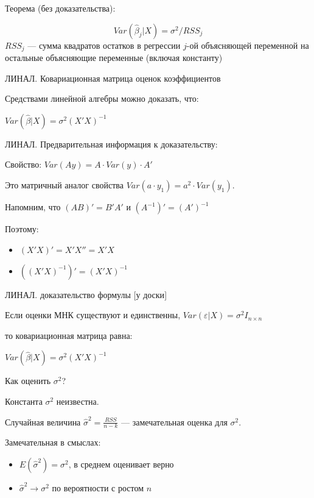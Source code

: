 \documentclass[russian,ignorenonframetext,]{beamer}
\begin{document}
\begin{frame}{Теорема (без доказательства):}

\[
Var(\hat{\beta}_j| X)=\sigma^2/RSS_j
\] \(RSS_j\) --- сумма квадратов остатков в регрессии \(j\)-ой
объясняющей переменной на остальные объясняющие переменные (включая
константу)

\end{frame}

\begin{frame}{ЛИНАЛ. Ковариационная матрица оценок коэффициентов}

Средствами линейной алгебры можно доказать, что:

\(Var(\hat{\beta}|X)=\sigma^2 (X'X)^{-1}\)

\end{frame}

\begin{frame}{ЛИНАЛ. Предварительная информация к доказательству:}

Свойство: \(Var(Ay)=A\cdot Var(y) \cdot A'\)

Это матричный аналог свойства \(Var(a\cdot y_1)=a^2\cdot Var(y_1)\).

Напомним, что \((AB)'=B'A'\) и \((A^{-1})'=(A')^{-1}\)

Поэтому:

\begin{itemize}
\item
  \((X'X)'=X'X''=X'X\)
\item
  \(((X'X)^{-1})'=(X'X)^{-1}\)
\end{itemize}

\end{frame}

\begin{frame}{ЛИНАЛ. доказательство формулы {[}у доски{]}}

Если оценки МНК существуют и единственны,
\(Var(\varepsilon|X)=\sigma^2 I_{n\times n}\)

то ковариационная матрица равна:

\(Var(\hat{\beta}|X)=\sigma^2 (X'X)^{-1}\)

\end{frame}

\begin{frame}{Как оценить \(\sigma^2\)?}

Константа \(\sigma^2\) неизвестна.

Случайная величина \(\hat{\sigma}^2=\frac{RSS}{n-k}\) --- замечательная
оценка для \(\sigma^2\).

Замечательная в смыслах:

\begin{itemize}
\item
  \(E(\hat{\sigma}^2)=\sigma^2\), в среднем оценивает верно
\item
  \(\hat{\sigma}^2 \to \sigma^2\) по вероятности с ростом \(n\)
\end{itemize}

\end{frame}
\end{document}
